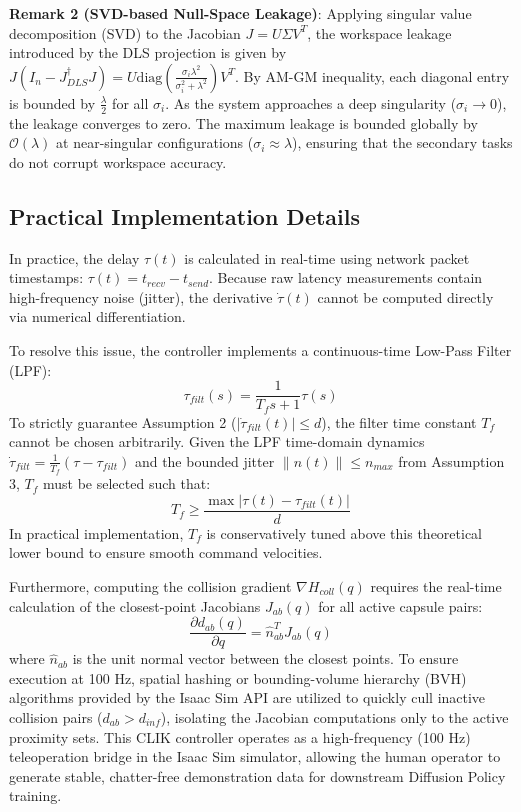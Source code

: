 \documentclass[letterpaper,journal]{IEEEtran}
\begin{document}
\textbf{Remark 2 (SVD-based Null-Space Leakage)}: Applying singular value decomposition (SVD) to the Jacobian $J = U \Sigma V^T$, the workspace leakage introduced by the DLS projection is given by $J \left( I_n - J^{\dagger}_{DLS}J \right) = U \text{diag}\left( \frac{\sigma_i \lambda^2}{\sigma_i^2 + \lambda^2} \right) V^T$. By AM-GM inequality, each diagonal entry is bounded by $\frac{\lambda}{2}$ for all $\sigma_i$. As the system approaches a deep singularity ($\sigma_i \to 0$), the leakage converges to zero. The maximum leakage is bounded globally by $\mathcal{O}(\lambda)$ at near-singular configurations ($\sigma_i \approx \lambda$), ensuring that the secondary tasks do not corrupt workspace accuracy.

\subsection{Practical Implementation Details}
In practice, the delay $\tau(t)$ is calculated in real-time using network packet timestamps: $\tau(t) = t_{recv} - t_{send}$. Because raw latency measurements contain high-frequency noise (jitter), the derivative $\dot{\tau}(t)$ cannot be computed directly via numerical differentiation. 

To resolve this issue, the controller implements a continuous-time Low-Pass Filter (LPF):
\begin{equation}
\tau_{filt}(s) = \frac{1}{T_f s + 1} \tau(s)
\end{equation}
To strictly guarantee Assumption 2 ($|\dot{\tau}_{filt}(t)| \le d$), the filter time constant $T_f$ cannot be chosen arbitrarily. Given the LPF time-domain dynamics $\dot{\tau}_{filt} = \frac{1}{T_f} (\tau - \tau_{filt})$ and the bounded jitter $\|n(t)\| \le n_{max}$ from Assumption 3, $T_f$ must be selected such that:
\begin{equation}
T_f \ge \frac{\max |\tau(t) - \tau_{filt}(t)|}{d}
\end{equation}
In practical implementation, $T_f$ is conservatively tuned above this theoretical lower bound to ensure smooth command velocities.

Furthermore, computing the collision gradient $\nabla H_{coll}(q)$ requires the real-time calculation of the closest-point Jacobians $J_{ab}(q)$ for all active capsule pairs:
\begin{equation}
\frac{\partial d_{ab}(q)}{\partial q} = \hat{n}_{ab}^T J_{ab}(q)
\end{equation}
where $\hat{n}_{ab}$ is the unit normal vector between the closest points. To ensure execution at 100 Hz, spatial hashing or bounding-volume hierarchy (BVH) algorithms provided by the Isaac Sim API are utilized to quickly cull inactive collision pairs ($d_{ab} > d_{inf}$), isolating the Jacobian computations only to the active proximity sets. This CLIK controller operates as a high-frequency (100 Hz) teleoperation bridge in the Isaac Sim simulator, allowing the human operator to generate stable, chatter-free demonstration data for downstream Diffusion Policy training.
\end{document}
